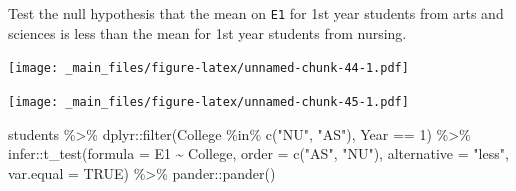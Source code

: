 \documentclass[
]{book}
\newenvironment{Shaded}{\begin{snugshade}}{\end{snugshade}}
\newcommand{\AttributeTok}[1]{\textcolor[rgb]{0.77,0.63,0.00}{#1}}
\newcommand{\ConstantTok}[1]{\textcolor[rgb]{0.00,0.00,0.00}{#1}}
\newcommand{\DecValTok}[1]{\textcolor[rgb]{0.00,0.00,0.81}{#1}}
\newcommand{\FunctionTok}[1]{\textcolor[rgb]{0.00,0.00,0.00}{#1}}
\newcommand{\NormalTok}[1]{#1}
\newcommand{\SpecialCharTok}[1]{\textcolor[rgb]{0.00,0.00,0.00}{#1}}
\newcommand{\StringTok}[1]{\textcolor[rgb]{0.31,0.60,0.02}{#1}}
\begin{document}
Test the null hypothesis that the mean on \texttt{E1} for 1st year students from arts and sciences is less than the mean for 1st year students from nursing.

\texttt{[image: \_main\_files/figure-latex/unnamed-chunk-44-1.pdf]}

\texttt{[image: \_main\_files/figure-latex/unnamed-chunk-45-1.pdf]}

\begin{Shaded}
\begin{Highlighting}[]
\NormalTok{students }\SpecialCharTok{\%\textgreater{}\%}
\NormalTok{  dplyr}\SpecialCharTok{::}\FunctionTok{filter}\NormalTok{(College }\SpecialCharTok{\%in\%} \FunctionTok{c}\NormalTok{(}\StringTok{"NU"}\NormalTok{, }\StringTok{"AS"}\NormalTok{), Year }\SpecialCharTok{==} \DecValTok{1}\NormalTok{) }\SpecialCharTok{\%\textgreater{}\%}
\NormalTok{  infer}\SpecialCharTok{::}\FunctionTok{t\_test}\NormalTok{(}\AttributeTok{formula =}\NormalTok{ E1 }\SpecialCharTok{\textasciitilde{}}\NormalTok{ College, }
       \AttributeTok{order =} \FunctionTok{c}\NormalTok{(}\StringTok{"AS"}\NormalTok{, }\StringTok{"NU"}\NormalTok{),}
       \AttributeTok{alternative =} \StringTok{"less"}\NormalTok{, }
       \AttributeTok{var.equal =} \ConstantTok{TRUE}\NormalTok{) }\SpecialCharTok{\%\textgreater{}\%} 
\NormalTok{  pander}\SpecialCharTok{::}\FunctionTok{pander}\NormalTok{()}
\end{Highlighting}
\end{Shaded}
\end{document}
